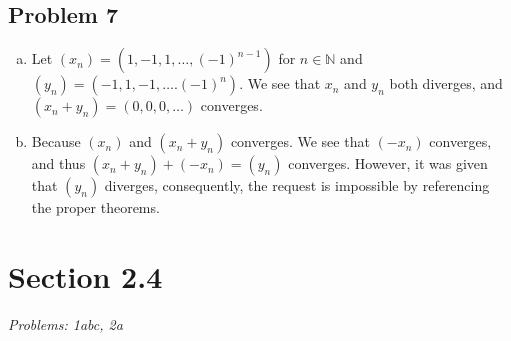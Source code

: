 \documentclass[12pt]{article}
\begin{document}
\subsection*{Problem 7}
\begin{enumerate}[a).]
    \item {
    Let $(x_n) = (1, -1, 1, \dots, (-1)^{n-1})$ for $n \in \mathbb{N}$ and $(y_n) = (-1, 1, -1, \dots. (-1)^{n})$.
    We see that $x_n$ and $y_n$ both diverges, and $(x_n + y_n) = (0,0,0,\dots)$ converges. 
    }

    \item {
    Because $(x_n)$ and $(x_n + y_n)$ converges. 
    We see that $(-x_n)$ converges, and thus $(x_n + y_n) + (-x_n) = (y_n)$ converges.
    However, it was given that $(y_n)$ diverges, consequently, the request is impossible by referencing the proper theorems. 
    }
\end{enumerate}




\vspace*{1cm}

\section*{Section 2.4}
\textit{Problems: 1abc, 2a}
\end{document}
